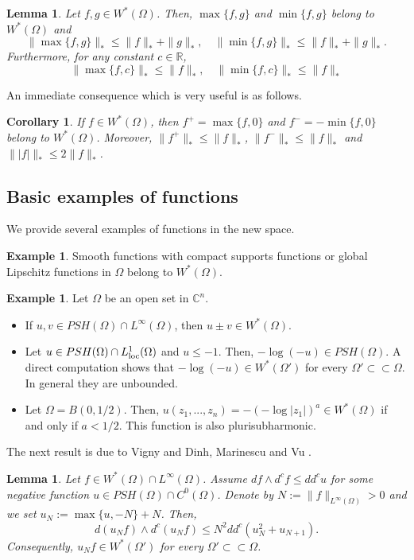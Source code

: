 \documentclass{amsart}
\newcommand{\Om}{\Omega}
\newcommand{\bR}{\mathbb{R}}
\newcommand{\bC}{\mathbb{C}}
\newtheorem{lem}[thm]{Lemma}
\newtheorem{cor}[thm]{Corollary}
\theoremstyle{definition}
\newtheorem{expl}[thm]{Example}
\numberwithin{thm}{section}
\numberwithin{equation}{section}
\renewcommand{\[}{\begin{equation}}
\renewcommand{\]}{\end{equation}}
\newcommand{\wed}{\wedge}
\begin{document}
\begin{lem}\label{lem:norm-min-max} Let $f, g \in W^*(\Om)$. Then,  $\max\{f, g\}$ and $\min\{f,g\}$ belong to $W^*(\Om)$ and 
$$
	\|\max\{f,g\} \|_* \leq \|f\|_* + \|g\|_*, \quad
	\|\min\{f, g\}\|_* \leq \|f\|_* + \|g\|_*.
$$
Furthermore, for any constant $c\in \bR$,
\[ \label{eq:norm-max-min}
	\| \max\{f,c\}\|_* \leq \| f \|_*, \quad \|\min\{f,c\}\|_* \leq \|f\|_*
\]
\end{lem}

An immediate consequence which is very useful  is  as follows.

\begin{cor} If $f\in W^*(\Om)$, then $f^+ = \max\{f,0\}$ and $f^- = -\min\{f, 0\}$ belong to $W^*(\Om)$. Moreover,  $\|f^+\|_* \leq \|f\|_*$, $\|f^-\|_* \leq \|f\|_*$ and $\| |f| \|_* \leq 2 \|f\|_*$.
\end{cor}

\subsection{Basic examples of functions}  We provide several examples of functions in the  new space.

\begin{expl} \label{expl:obv} Smooth functions with compact supports functions or  global Lipschitz functions in $\Om$ belong to $W^*(\Om)$.
\end{expl}

\begin{expl} \label{expl:basic} Let $\Om$ be an open set in $\bC^n$.
\begin{itemize}
\item[(a)]
If $u, v \in PSH(\Om) \cap L^\infty(\Om)$, then $u \pm  v \in W^*(\Om)$. 
\item[(b)] Let $u \in PSH(\Om) \cap L^1_{\rm loc}(\Om)$ and $u \leq -1$. Then, $-\log (-u) \in  PSH(\Om)$. A direct computation shows that $-\log (-u) \in W^*(\Om')$ for every $\Om'\subset\subset \Om.$ In general they are unbounded.
\item[(c)]
Let $\Om = B(0, 1/2)$. Then, $u(z_1, ...,z_n) = -(-\log |z_1|)^a \in W^*(\Om)$  if and only if $a<1/2.$ This function is also plurisubharmonic.
\end{itemize}
\end{expl}

The next result is due to Vigny \cite{Vigny} and Dinh, Marinescu and Vu \cite[Lemma~2.8]{DMV}.

\begin{lem} \label{expl:construction} Let $f\in W^*(\Om) \cap L^\infty(\Om)$. Assume  $df \wed d^c f \leq dd^c u$ for some negative function $u \in PSH(\Om) \cap C^0(\Om)$.  Denote by $N:= \|f\|_{L^\infty(\Om)}>0$ and we set $u_N := \max\{u, -N\}+N$. Then, 
$$
	d (u_N f) \wed d^c (u_N f) \leq N^2 dd^c (u_N^2 + u_{N+1}).
$$
Consequently, $u_N f \in W^*(\Om')$ for every $\Om'\subset\subset \Om$.%
\end{lem}
\end{document}
